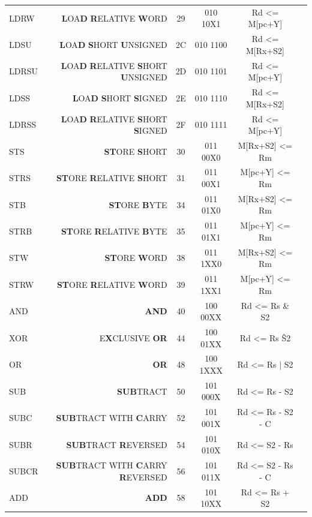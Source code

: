 \documentclass[
	article,			%
	11pt,				%
	oneside,			%
	a4paper,			%
	english,			%
	brazil,				%
	sumario=tradicional
	]{abntex2}
\begin{document}
\begin{table}[!htp]
\begin{tabular}{lrccrrrr}
LDRW &\textbf{L}OA\textbf{D} \textbf{R}ELATIVE \textbf{W}ORD &29 &010 10X1 &\multicolumn{3}{c}{Rd <= M[pc+Y]} \\
LDSU &\textbf{L}OA\textbf{D} \textbf{S}HORT \textbf{U}NSIGNED &2C &010 1100 &\multicolumn{3}{c}{Rd <= M[Rx+S2]} \\
LDRSU &\textbf{L}OA\textbf{D} \textbf{R}ELATIVE \textbf{S}HORT \textbf{U}NSIGNED &2D &010 1101 &\multicolumn{3}{c}{Rd <= M[pc+Y]} \\
LDSS &\textbf{L}OA\textbf{D} \textbf{S}HORT \textbf{S}IG\textbf{}NED &2E &010 1110 &\multicolumn{3}{c}{Rd <= M[Rx+S2]} \\
LDRSS &\textbf{L}OA\textbf{D} \textbf{R}ELATIVE \textbf{S}HORT \textbf{S}IGNED &2F &010 1111 &\multicolumn{3}{c}{Rd <= M[pc+Y]} \\
STS &\textbf{ST}ORE \textbf{S}HORT &30 &011 00X0 &\multicolumn{3}{c}{M[Rx+S2] <= Rm} \\
STRS &\textbf{ST}ORE \textbf{R}ELATIVE \textbf{S}HORT &31 &011 00X1 &\multicolumn{3}{c}{M[pc+Y] <= Rm} \\
STB &\textbf{ST}ORE \textbf{B}YTE &34 &011 01X0 &\multicolumn{3}{c}{M[Rx+S2] <= Rm} \\
STRB &\textbf{ST}ORE \textbf{R}ELATIVE \textbf{B}YTE &35 &011 01X1 &\multicolumn{3}{c}{M[pc+Y] <= Rm} \\
STW &\textbf{ST}ORE \textbf{W}ORD &38 &011 1XX0 &\multicolumn{3}{c}{M[Rx+S2] <= Rm} \\
STRW &\textbf{ST}ORE \textbf{R}ELATIVE \textbf{W}ORD &39 &011 1XX1 &\multicolumn{3}{c}{M[pc+Y] <= Rm} \\
AND &\textbf{AND} &40 &100 00XX &\multicolumn{3}{c}{Rd <= Rs \& S2} \\
XOR &E\textbf{X}CLUSIVE \textbf{OR} &44 &100 01XX &\multicolumn{3}{c}{Rd <= Rs \^ S2} \\
OR &\textbf{OR} &48 &100 1XXX &\multicolumn{3}{c}{Rd <= Rs | S2} \\
SUB &\textbf{SUB}TRACT &50 &101 000X &\multicolumn{3}{c}{Rd <= Rs - S2} \\
SUBC &\textbf{SUB}TRACT WITH \textbf{C}ARRY &52 &101 001X &\multicolumn{3}{c}{Rd <= Rs - S2 - C} \\
SUBR &\textbf{SUB}TRACT \textbf{R}EVERSED &54 &101 010X &\multicolumn{3}{c}{Rd <= S2 - Rs} \\
SUBCR &\textbf{SUB}TRACT WITH \textbf{C}ARRY \textbf{R}EVERSED &56 &101 011X &\multicolumn{3}{c}{Rd <= S2 - Rs - C} \\
ADD &\textbf{ADD} &58 &101 10XX &\multicolumn{3}{c}{Rd <= Rs + S2} \\

\end{tabular}
\end{table}
\end{document}
